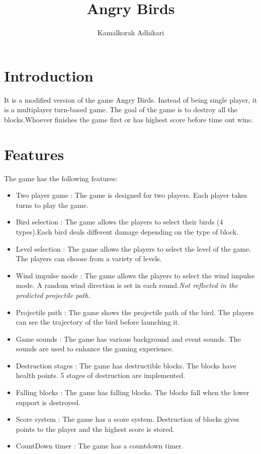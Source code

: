 \documentclass{article}
\title{Angry Birds}
\author{Kamalkorak Adhikari}
\begin{document}
\maketitle
\section{Introduction}
It is a modified version of the game Angry Birds.
Instead of being single player, it is a multiplayer turn-based game.
The goal of the game is to destroy all the blocks.Whoever finishes the game first or has highest score before time out wins.
\section{Features}
The game has the following features:
\begin{itemize}
    \item Two player game : The game is designed for two players. Each player takes turns to play the game.
    \item Bird selection : The game allows the players to select their birds (4 types).Each bird deals different damage depending on the type of block.
    \item Level selection : The game allows the players to select the level of the game. The players can choose from a variety of levels.
    \item Wind impulse mode : The game allows the players to select the wind impulse mode. A random wind direction is set in each round.\newline \emph{Not reflected in the predicted projectile path.}
    \item Projectile path : The game shows the projectile path of the bird. The players can see the trajectory of the bird before launching it.
    \item Game sounds : The game has various background and event sounds. The sounds are used to enhance the gaming experience.
    \item Destruction stages : The game has destructible blocks. The blocks have health points. 5 stages of destruction are implemented.
    \item Falling blocks : The game has falling blocks. The blocks fall when the lower support is destroyed.
    \item Score system : The game has a score system. Destruction of blocks gives points to the player and the highest score is stored.
    \item CountDown timer : The game has a countdown timer.
\end{itemize}
\pagebreak
\end{document}
